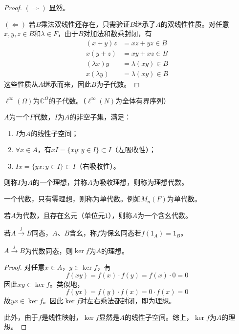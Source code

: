 \documentclass[lang=cn,a4paper,newtx,section]{elegantbook}
\begin{document}
\begin{proof}
  $(\Rightarrow)$ 显然。
  
  $(\Leftarrow)$ 若$B$乘法双线性还存在，只需验证$B$继承了$A$的双线性性质。对任意$x, y, z \in B$和$\lambda \in F$，由于$B$对加法和数乘封闭，有
  \begin{align*}
    (x+y)z &= xz + yz \in B \\
    x(y+z) &= xy + xz \in B \\
    (\lambda x)y &= \lambda(xy) \in B \\
    x(\lambda y) &= \lambda(xy) \in B
  \end{align*}
  这些性质从$A$继承而来，因此$B$为子代数。
\end{proof}

\begin{example}
  $\ell^\infty(\Omega)$为$\mathbb{C}^\Omega$的子代数。（$\ell^\infty(N)$为全体有界序列）
\end{example}

\begin{definition}[理想]
  $A$为一个$F$代数，$I$为$A$的非空子集，满足：
  \begin{enumerate}
    \item $I$为$A$的线性子空间；
    \item $\forall x \in A$，有$xI = \{xy : y \in I\} \subset I$（左吸收性）；
    \item $Ix = \{yx : y \in I\} \subset I$（右吸收性）。
  \end{enumerate}
  则称$I$为$A$的一个理想，并称$A$为吸收理想，则称为理想代数。
\end{definition}

\begin{remark}
  一个代数，只有零理想，则称为单代数。例如$M_n(F)$为单代数。
\end{remark}

\begin{definition}[含幺代数]
  若$A$为代数，且存在幺元（单位元$1$），则称$A$为一个含幺代数。
\end{definition}

\begin{definition}[保幺同态]
  若$A \xrightarrow{f} B$同态，$A$、$B$含幺，称$f$为保幺同态若$f(1_A) = 1_B$。
\end{definition}

\begin{proposition}
  $A \xrightarrow{f} B$为代数同态，则$\ker f$为$A$的理想。
\end{proposition}

\begin{proof}
  对任意$x \in A$，$y \in \ker f$，有
  \begin{equation*}
    f(xy) = f(x) \cdot f(y) = f(x) \cdot 0 = 0
  \end{equation*}
  因此$xy \in \ker f$。类似地，
  \begin{equation*}
    f(yx) = f(y) \cdot f(x) = 0 \cdot f(x) = 0
  \end{equation*}
  故$yx \in \ker f$。因此$\ker f$对左右乘法都封闭，即为理想。
  
  此外，由于$f$是线性映射，$\ker f$显然是$A$的线性子空间。综上，$\ker f$为$A$的理想。
\end{proof}
\end{document}
